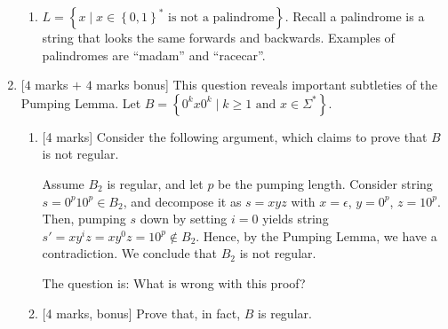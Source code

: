 \documentclass{article}
\newcommand{\set}[1]{{\left\{#1\right\}}}    %
\begin{document}
\begin{enumerate}
\begin{enumerate}
            \item $L=\set{x\mid x\in\set{0,1}^*\text{ is not a palindrome}}$. Recall a palindrome is a string that looks the same forwards and backwards. Examples of palindromes are ``madam'' and ``racecar''.
        \end{enumerate}
    \item  {[$4$ marks $+$ $4$ marks bonus]} This question reveals important subtleties of the Pumping Lemma. Let $B=\set{0^kx0^k \mid k\geq 1\text{ and } x\in\Sigma^*}$.
                \begin{enumerate}
                \item{[4 marks]} Consider the following argument, which claims to prove that $B$ is not regular.

                    Assume $B_2$ is regular, and let $p$ be the pumping length. Consider string $s=0^p10^p\in B_2$, and decompose it as $s=xyz$ with $x=\epsilon$, $y=0^p$, $z=10^p$. Then, pumping $s$ down by setting $i=0$ yields string $s'=xy^iz=xy^0z=10^p\not \in B_2$. Hence, by the Pumping Lemma, we have a contradiction. We conclude that $B_2$ is not regular.

                    The question is: What is wrong with this proof?
                \item {[4 marks, bonus]} Prove that, in fact, $B$ is regular.
            \end{enumerate}
\end{enumerate}
\end{document}
